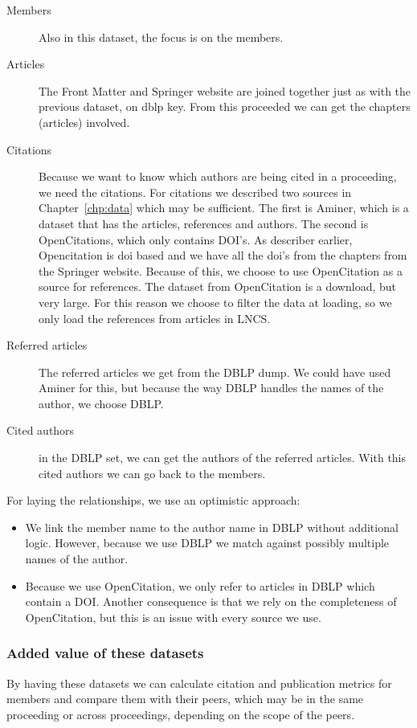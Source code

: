 \documentclass{ou-report}
\begin{document}
\begin{description}
    \item[Members] Also in this dataset, the focus is on the members.
    \item[Articles] The Front Matter and Springer website are joined together 
    just as with the previous dataset, on dblp key. From this proceeded we
    can get the chapters (articles) involved.
    \item[Citations] Because we want to know which authors are being cited in 
    a proceeding, we need the citations. 
    For citations we described two sources in Chapter~\ref{chp:data} which may be 
    sufficient. The first is Aminer, which is a dataset that has the articles, 
    references and authors. The second is OpenCitations, which only contains DOI's. 
    As describer earlier, Opencitation is doi based and we have all the doi's from 
    the chapters from the Springer website. Because of this, we choose to use 
    OpenCitation as a source for references.
    The dataset from OpenCitation is a download, but very large. For this reason
    we choose to filter the data at loading, so we only load the references from
    articles in LNCS.
    \item[Referred articles] The referred articles we get from the DBLP dump.
    We could have used Aminer for this, but because the way DBLP handles 
    the names of the author, we choose DBLP.
    \item[Cited authors] in the DBLP set, we can get the authors of the referred
    articles. With this cited authors we can go back to the members.
\end{description}
For laying the relationships, we use an optimistic approach:
\begin{itemize}
    \item We link the member name to the author name in DBLP without additional 
    logic. However, because we use DBLP we match against possibly multiple names
    of the author.
    \item Because we use OpenCitation, we only refer to articles in DBLP which 
    contain a DOI. Another consequence is that we rely on the completeness of
    OpenCitation, but this is an issue with every source we use.
\end{itemize}

\subsubsection{Added value of these datasets}
By having these datasets we can calculate citation and publication metrics for 
members and 
compare them with their peers, which may be in the same proceeding or across 
proceedings, depending on the scope of the peers.
\end{document}
